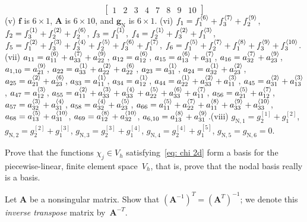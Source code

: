 \begin{Exercises}
\begin{ans}
\[\begin{bmatrix}
 1& 2& 3& 4& 7& 8& 9& 10\end{bmatrix}
\]
(v) $\boldsymbol{f}$ is $6\times1$, $\boldsymbol{A}$ is $6\times10$, and
$\boldsymbol{g}_{\mathrm{N}}$ is $6\times1$.\quad 
(vi) $f_1=f^{\langle6\rangle}_1+f^{\langle7\rangle}_3+f^{\langle9\rangle}_2$,
$f_2=f^{\langle1\rangle}_3+f^{\langle2\rangle}_2+f^{\langle6\rangle}_2$, $f_3=f^{\langle1\rangle}_1$,
$f_4=f^{\langle1\rangle}_2+f^{\langle2\rangle}_3+f^{\langle3\rangle}_1$,
$f_5=f^{\langle2\rangle}_1+f^{\langle3\rangle}_3+f^{\langle4\rangle}_3+f^{\langle5\rangle}_2+f^{\langle6\rangle}_3+f^{\langle7\rangle}_1$,
$f_6=f^{\langle5\rangle}_1+f^{\langle7\rangle}_2+f^{\langle8\rangle}_1+f^{\langle9\rangle}_3+f^{\langle10\rangle}_3$.\quad
(vii) $a_{11}=a^{\langle6\rangle}_{11}+a^{\langle7\rangle}_{33}+a^{\langle9\rangle}_{22}$,
$a_{12}=a^{\langle6\rangle}_{12}$, $a_{15}=a^{\langle6\rangle}_{13}+a^{\langle7\rangle}_{31}$,
$a_{16}=a^{\langle7\rangle}_{32}+a^{\langle9\rangle}_{23}$, $a_{1,10}=a^{\langle9\rangle}_{21}$,
$a_{22}=a^{\langle1\rangle}_{33}+a^{\langle2\rangle}_{22}+a^{\langle6\rangle}_{22}$, $a_{23}=a^{\langle1\rangle}_{31}$,
$a_{24}=a^{\langle1\rangle}_{32}+a^{\langle2\rangle}_{23}$, $a_{25}=a^{\langle2\rangle}_{21}+a^{\langle6\rangle}_{23}$,
$a_{33}=a^{\langle1\rangle}_{11}$, $a_{34}=a^{\langle1\rangle}_{12}$,
$a_{44}=a^{\langle1\rangle}_{22}+a^{\langle2\rangle}_{33}+a^{\langle3\rangle}_{11}$,
$a_{45}=a^{\langle2\rangle}_{31}+a^{\langle3\rangle}_{13}$, $a_{47}=a^{\langle3\rangle}_{12}$,
$a_{55}=a^{\langle2\rangle}_{11}+a^{\langle3\rangle}_{33}+a^{\langle4\rangle}_{33}+a^{\langle5\rangle}_{22}
+a^{\langle6\rangle}_{33}+a^{\langle7\rangle}_{11}$, $a_{56}=a^{\langle5\rangle}_{21}+a^{\langle7\rangle}_{12}$,
$a_{57}=a^{\langle3\rangle}_{32}+a^{\langle4\rangle}_{31}$, $a_{58}=a^{\langle4\rangle}_{32}+a^{\langle5\rangle}_{23}$,
$a_{66}=a^{\langle5\rangle}_{11}+a^{\langle7\rangle}_{22}+a^{\langle8\rangle}_{11}+a^{\langle9\rangle}_{33}
+a^{\langle10\rangle}_{33}$, $a_{68}=a^{\langle5\rangle}_{13}+a^{\langle10\rangle}_{31}$,
$a_{69}=a^{\langle8\rangle}_{12}+a^{\langle10\rangle}_{32}$, 
$a_{6,10}=a^{\langle8\rangle}_{13}+a^{\langle9\rangle}_{31}$.\quad(viii) 
$g_{\mathrm{N},1}=g^{[1]}_2+g^{[2]}_1$,
$g_{\mathrm{N},2}=g^{[2]}_2+g^{[3]}_1$,
$g_{\mathrm{N},3}=g^{[3]}_2+g^{[4]}_1$,
$g_{\mathrm{N},4}=g^{[4]}_2+g^{[5]}_1$,
$g_{\mathrm{N},5}=g_{\mathrm{N},6}=0$.

\end{ans}

\exercise\label{ex: nodal basis}
Prove that the functions $\chi_j\in V_h$ satisfying~\eqref{eq: chi 2d} form a 
basis for the piecewise-linear, finite element space~$V_h$, that is, prove that 
the nodal basis really is a basis. 

\exercise\label{ex: inv transpose}
Let $\boldsymbol{A}$ be a nonsingular matrix.
Show that $(\boldsymbol{A}^{-1})^T=(\boldsymbol{A}^T)^{-1}$; we denote this 
\emph{inverse transpose} matrix by~$\boldsymbol{A}^{-T}$.


\end{Exercises}
